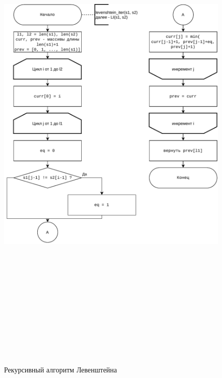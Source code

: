         \begin{figure}
            \centering
            \includegraphics[width=15cm,height=25cm,keepaspectratio]{images/leven_iter.pdf}
            \caption{Рекурсивный алгоритм Левенштейна}
            \label{fig:leven_iter}
        \end{figure}
        
